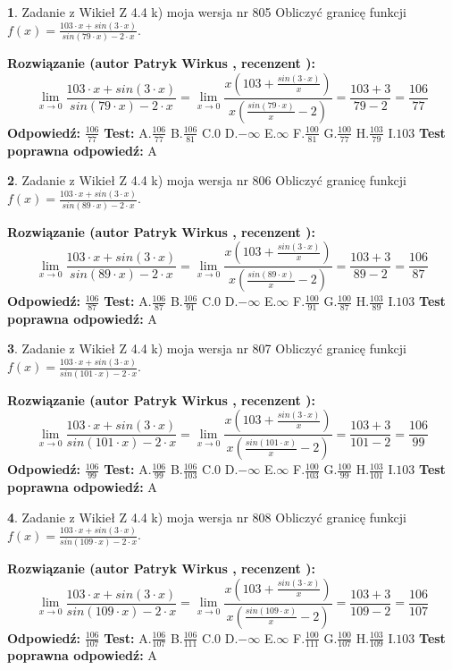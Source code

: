 \documentclass[12pt, a4paper]{article}
\theoremstyle{definition} %
\newtheorem{zad}{}
\newcommand{\zadStart}[1]{\begin{zad}#1\newline}
\newcommand{\zadStop}{\end{zad}}
\newcommand{\rozwStart}[2]{\noindent \textbf{Rozwiązanie (autor #1 , recenzent #2): }\newline}
\newcommand{\rozwStop}{\newline}
\newcommand{\odpStart}{\noindent \textbf{Odpowiedź:}\newline}
\newcommand{\odpStop}{\newline}
\newcommand{\testStart}{\noindent \textbf{Test:}\newline}
\newcommand{\testStop}{\newline}
\newcommand{\kluczStart}{\noindent \textbf{Test poprawna odpowiedź:}\newline}
\newcommand{\kluczStop}{\newline}
\begin{document}
\zadStart{Zadanie z Wikieł Z 4.4 k) moja wersja nr 805}
Obliczyć granicę funkcji $f(x)=\frac{103\cdot x +sin(3\cdot x)}{sin(79\cdot x) -2\cdot x}$.
\zadStop
\rozwStart{Patryk Wirkus}{}
$$\lim\limits_{x\to 0}\frac{103\cdot x +sin(3\cdot x)}{sin(79\cdot x) -2\cdot x}
=\lim\limits_{x\to 0}\frac{x(103+\frac{sin(3\cdot x)}{x})}{x(\frac{sin(79\cdot x)}{x}-2)}
=\frac{103+3}{79-2} = \frac{106}{77}$$
\rozwStop
\odpStart
$\frac{106}{77}$
\odpStop
\testStart
A.$\frac{106}{77}$
B.$\frac{106}{81}$
C.$0$
D.$-\infty$
E.$\infty$
F.$\frac{100}{81}$
G.$\frac{100}{77}$
H.$\frac{103}{79}$
I.$103$
\testStop
\kluczStart
A
\kluczStop



\zadStart{Zadanie z Wikieł Z 4.4 k) moja wersja nr 806}
Obliczyć granicę funkcji $f(x)=\frac{103\cdot x +sin(3\cdot x)}{sin(89\cdot x) -2\cdot x}$.
\zadStop
\rozwStart{Patryk Wirkus}{}
$$\lim\limits_{x\to 0}\frac{103\cdot x +sin(3\cdot x)}{sin(89\cdot x) -2\cdot x}
=\lim\limits_{x\to 0}\frac{x(103+\frac{sin(3\cdot x)}{x})}{x(\frac{sin(89\cdot x)}{x}-2)}
=\frac{103+3}{89-2} = \frac{106}{87}$$
\rozwStop
\odpStart
$\frac{106}{87}$
\odpStop
\testStart
A.$\frac{106}{87}$
B.$\frac{106}{91}$
C.$0$
D.$-\infty$
E.$\infty$
F.$\frac{100}{91}$
G.$\frac{100}{87}$
H.$\frac{103}{89}$
I.$103$
\testStop
\kluczStart
A
\kluczStop



\zadStart{Zadanie z Wikieł Z 4.4 k) moja wersja nr 807}
Obliczyć granicę funkcji $f(x)=\frac{103\cdot x +sin(3\cdot x)}{sin(101\cdot x) -2\cdot x}$.
\zadStop
\rozwStart{Patryk Wirkus}{}
$$\lim\limits_{x\to 0}\frac{103\cdot x +sin(3\cdot x)}{sin(101\cdot x) -2\cdot x}
=\lim\limits_{x\to 0}\frac{x(103+\frac{sin(3\cdot x)}{x})}{x(\frac{sin(101\cdot x)}{x}-2)}
=\frac{103+3}{101-2} = \frac{106}{99}$$
\rozwStop
\odpStart
$\frac{106}{99}$
\odpStop
\testStart
A.$\frac{106}{99}$
B.$\frac{106}{103}$
C.$0$
D.$-\infty$
E.$\infty$
F.$\frac{100}{103}$
G.$\frac{100}{99}$
H.$\frac{103}{101}$
I.$103$
\testStop
\kluczStart
A
\kluczStop



\zadStart{Zadanie z Wikieł Z 4.4 k) moja wersja nr 808}
Obliczyć granicę funkcji $f(x)=\frac{103\cdot x +sin(3\cdot x)}{sin(109\cdot x) -2\cdot x}$.
\zadStop
\rozwStart{Patryk Wirkus}{}
$$\lim\limits_{x\to 0}\frac{103\cdot x +sin(3\cdot x)}{sin(109\cdot x) -2\cdot x}
=\lim\limits_{x\to 0}\frac{x(103+\frac{sin(3\cdot x)}{x})}{x(\frac{sin(109\cdot x)}{x}-2)}
=\frac{103+3}{109-2} = \frac{106}{107}$$
\rozwStop
\odpStart
$\frac{106}{107}$
\odpStop
\testStart
A.$\frac{106}{107}$
B.$\frac{106}{111}$
C.$0$
D.$-\infty$
E.$\infty$
F.$\frac{100}{111}$
G.$\frac{100}{107}$
H.$\frac{103}{109}$
I.$103$
\testStop
\kluczStart
A
\kluczStop
\end{document}
